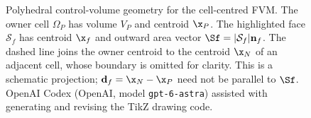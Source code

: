 \begin{figure}[htbp]
    \centering
    \caption{Polyhedral control-volume geometry for the cell-centred FVM.
    The owner cell $\Omega_P$ has volume $V_P$ and centroid $\x_P$.
    The highlighted face $\mathcal S_f$ has centroid $\x_f$ and outward
    area vector $\Sf=|\mathcal S_f|\mathbf n_f$.  The dashed line joins
    the owner centroid to the centroid $\x_N$ of an adjacent cell, whose
    boundary is omitted for clarity.  This is a schematic projection;
    $\mathbf d_f=\x_N-\x_P$ need not be parallel to $\Sf$.
    OpenAI Codex (OpenAI, model \texttt{gpt-6-astra}) assisted with generating
    and revising the TikZ drawing code.}
    \label{fig:standardFVMControlVolume}
\end{figure}
